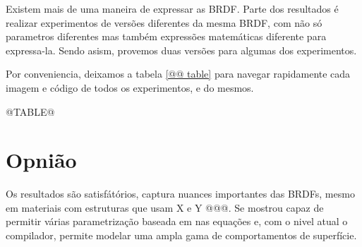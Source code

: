 Existem mais de uma maneira de expressar as BRDF. Parte dos resultados é realizar experimentos de versões diferentes da mesma BRDF, com não só parametros diferentes mas também expressões matemáticas diferente para expressa-la. Sendo asism, provemos duas versões para algumas dos experimentos.


Por conveniencia, deixamos a tabela \autoref{@@ table} para navegar rapidamente cada imagem e código de todos os experimentos, e  do mesmos.


@TABLE@


\section{Opnião}
Os resultados são satisfátórios, captura nuances importantes das BRDFs, mesmo em materiais com estruturas que usam X e Y @@@. Se mostrou capaz de permitir várias parametrização baseada em nas equações e, com o nivel atual o compilador, permite modelar uma ampla gama de comportamentos de superfície.
